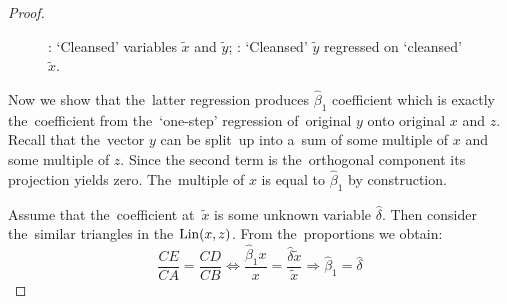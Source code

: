 \begin{proof}
\begin{figure}[ht!]
\begin{center}
\caption{: `Cleansed' variables $\tilde x$ and $\tilde y$;
: `Cleansed' $\tilde y$ regressed on `cleansed' $\tilde{x}$.}
\end{center}
\end{figure}

Now we show that the~latter regression produces $\hat \beta_1$ coefficient which
is exactly the~coefficient from the~`one-step' regression of~original $y$ onto
original $x$ and $z$. Recall that the~vector $y$ can be split~up into a~sum of
some multiple of $x$ and some multiple of $z$. Since the second term is
the~orthogonal component its projection yields zero. The~multiple of $x$
is equal to $\hat \beta_1$ by construction.

Assume that the~coefficient at~$\tilde x$ is some unknown variable $\hat \delta$.
Then consider the~similar triangles in the $\operatorname{Lin}(x,z)$. From the~proportions
we obtain:
\[
\frac{CE}{CA} = \frac{CD}{CB} \Leftrightarrow \frac{\hat \beta_1 x}{x} = \frac{\hat \delta \tilde x}{\tilde x} \Rightarrow \hat \beta_1 = \hat \delta
\]


\end{proof}
